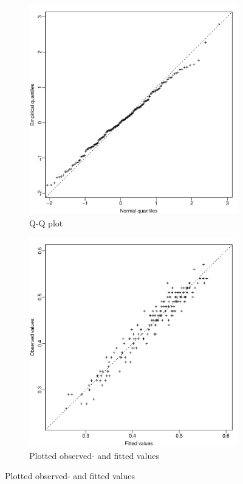 \documentclass[12pt,a4paper,twoside]{article}
\begin{document}
\begin{figure}[!ht]
    \begin{subfigure}{0.5\textwidth}
        \centering
        \includegraphics[width=\textwidth]{img/BARMA-Q-Q.pdf}
        \caption{Q-Q plot}
        \label{fig:BARMAQQ}
    \end{subfigure}
    \begin{subfigure}{0.5\textwidth}
        \centering
        \includegraphics[width=\textwidth]{img/BARMA-obs--fitted.pdf}
        \caption{Plotted observed- and fitted values}
        \label{fig:BARMAobsfitted}
    \end{subfigure}
\end{figure}
\end{document}
